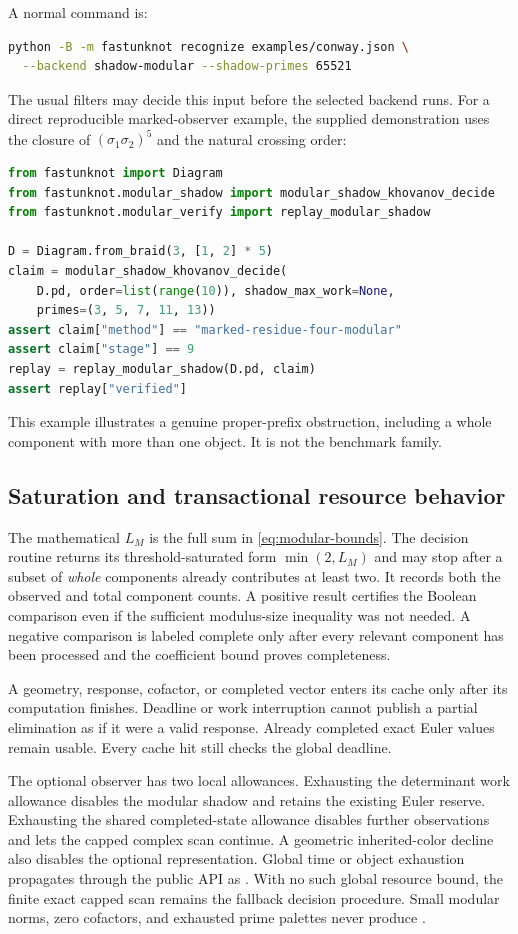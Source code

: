 A normal command is:
\begin{lstlisting}[language=bash]
python -B -m fastunknot recognize examples/conway.json \
  --backend shadow-modular --shadow-primes 65521
\end{lstlisting}
The usual filters may decide this input before the selected backend runs.
For a direct reproducible marked-observer example, the supplied demonstration
uses the closure of $(\sigma_1\sigma_2)^5$ and the natural crossing order:
\begin{lstlisting}[language=Python]
from fastunknot import Diagram
from fastunknot.modular_shadow import modular_shadow_khovanov_decide
from fastunknot.modular_verify import replay_modular_shadow

D = Diagram.from_braid(3, [1, 2] * 5)
claim = modular_shadow_khovanov_decide(
    D.pd, order=list(range(10)), shadow_max_work=None,
    primes=(3, 5, 7, 11, 13))
assert claim["method"] == "marked-residue-four-modular"
assert claim["stage"] == 9
replay = replay_modular_shadow(D.pd, claim)
assert replay["verified"]
\end{lstlisting}
This example illustrates a genuine proper-prefix obstruction, including a
whole component with more than one object. It is not the benchmark family.

\subsection{Saturation and transactional resource behavior}

The mathematical $L_M$ is the full sum in \cref{eq:modular-bounds}. The decision
routine returns its threshold-saturated form $\min(2,L_M)$ and may stop after
a subset of \emph{whole} components already contributes at least two. It records
both the observed and total component counts. A positive result certifies the
Boolean comparison even if the sufficient modulus-size inequality was not
needed. A negative comparison is labeled complete only after every relevant
component has been processed and the coefficient bound proves completeness.

A geometry, response, cofactor, or completed vector enters its cache only after
its computation finishes. Deadline or work interruption cannot publish a
partial elimination as if it were a valid response. Already completed exact
Euler values remain usable. Every cache hit still checks the global deadline.

The optional observer has two local allowances. Exhausting the determinant work
allowance disables the modular shadow and retains the existing Euler reserve.
Exhausting the shared completed-state allowance disables further observations
and lets the capped complex scan continue. A geometric inherited-color decline
also disables the optional representation. Global time or object exhaustion
propagates through the public API as \code{UNKNOWN}. With no such global
resource bound, the finite exact capped scan remains the fallback decision
procedure. Small modular norms, zero cofactors, and exhausted prime palettes
never produce \code{UNKNOT}.

